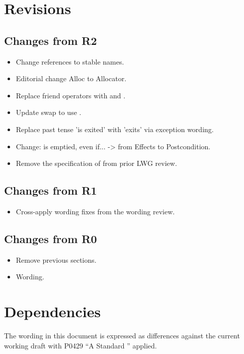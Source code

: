 \section{Revisions}

\subsection{Changes from R2}

\begin{itemize}
  \item Change references to stable names.
  \item Editorial change Alloc to Allocator.
  \item Replace friend operators with  and .
  \item Update swap to use .
  \item Replace past tense 'is exited' with 'exits' via exception wording.
  \item {} Change:  is emptied, even if...  -> from Effects to Postcondition.
  \item Remove the specification of  from prior LWG review.
\end{itemize}

\subsection{Changes from R1}

\begin{itemize}
  \item Cross-apply wording fixes from the  wording review.
\end{itemize}

\subsection{Changes from R0}

\begin{itemize}
  \item Remove previous sections.
  \item Wording.
\end{itemize}

\section{Dependencies}

The wording in this document is expressed as differences against the current
working draft with P0429 ``A Standard '' applied.

